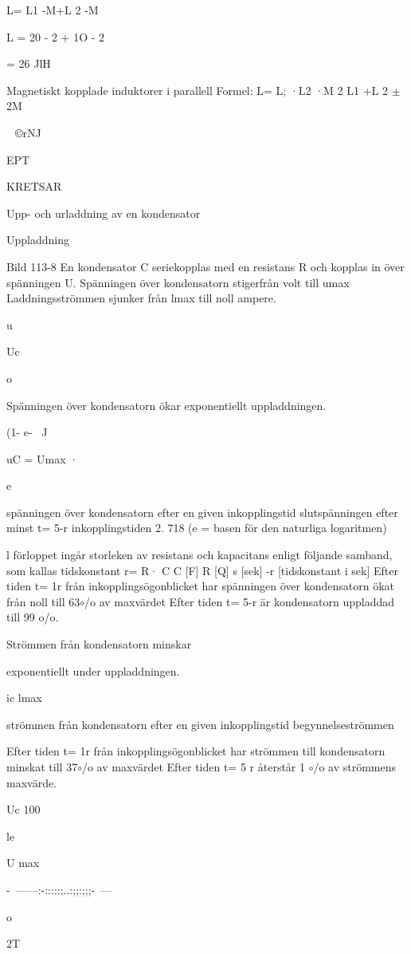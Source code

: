 L= L1 -M+L 2 -M

L = 20 - 2 + 1O - 2

= 26 JlH

Magnetiskt kopplade induktorer i parallell
Formel:
L= L; ·L2 ·M 2
L1 +L 2 \(\pm\)2M

~©rNJ

EPT

KRETSAR

Upp- och urladdning av en kondensator

Uppladdning

Bild 113-8
En kondensator C seriekopplas med en resistans R och kopplas in över spänningen U.
Spänningen över kondensatorn stigerfrån
volt till umax
Laddningsströmmen sjunker från lmax till
noll ampere.

u

Uc

o

Spänningen över kondensatorn ökar
exponentiellt uppladdningen.

(1- e-~ J

uC = Umax ·

e

spänningen över kondensatorn efter
en given inkopplingstid
slutspänningen efter minst t= 5-r
inkopplingstiden
2. 718 (e = basen för den naturliga
logaritmen)

l förloppet ingår storleken av resistans
och kapacitans enligt följande samband, som
kallas tidskonstant
r= R· C
C [F] R [Q] s [sek] -r [tidskonstant i sek]
Efter tiden t= 1r från inkopplingsögonblicket har spänningen över kondensatorn
ökat från noll till 63\(\circ\)/o av maxvärdet
Efter tiden t= 5-r är kondensatorn uppladdad till 99 o/o.

Strömmen från kondensatorn minskar

exponentiellt under uppladdningen.

ic
lmax

strömmen från kondensatorn efter en
given inkopplingstid
begynnelseströmmen

Efter tiden t= 1r från inkopplingsögonblicket har strömmen till kondensatorn
minskat till 37\(\circ\)/o av maxvärdet
Efter tiden t= 5 r återstår 1 \(\circ\)/o av strömmens maxvärde.

Uc
100%

le

U max

-~------:-:::::;..:;;:;;;-~---

o

2T

